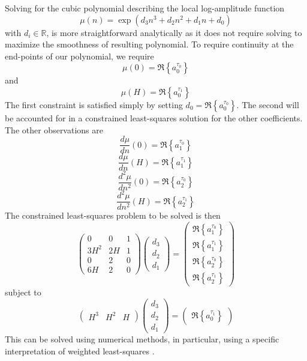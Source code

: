 Solving for the cubic polynomial describing the local log-amplitude function
\[
    \mu(n) = \exp \left(d_3 n^{3} + d_2 n^{2} + d_1 n + d_0 \right)
\]
with $d_i \in \mathbb{R}$, is more straightforward analytically as it does not
require solving to maximize the smoothness of resulting polynomial. To require
continuity at the end-points of our polynomial, we require
\[
    \mu(0) = \Re \left\{ a^{\tau_0}_0 \right\}
\]
and
\[
    \mu(H) = \Re \left\{ a^{\tau_1}_0 \right\}
\]
The first constraint is satisfied simply by setting $d_0 = \Re \left\{
a^{\tau_0}_0 \right\}$. The second will be accounted for in a constrained
least-squares solution for the other coefficients. The other observations are
\[
    \frac{d \mu}{dn} (0) = \Re \left\{ a^{\tau_0}_1 \right\}
\]
\[
    \frac{d \mu}{dn} (H) = \Re \left\{ a^{\tau_1}_1 \right\}
\]
\[
    \frac{d^2 \mu}{dn^2} (0) = \Re \left\{ a^{\tau_0}_2 \right\}
\]
\[
    \frac{d^2 \mu}{dn^2} (H) = \Re \left\{ a^{\tau_1}_2 \right\}
\]
The constrained least-squares problem to be solved is then
\[
    \begin{pmatrix}
        0 & 0 & 1 \\
        3 H^2 & 2 H & 1 \\
        0 & 2 & 0 \\
        6 H & 2 & 0
    \end{pmatrix}
    \begin{pmatrix}
        d_3 \\
        d_2 \\
        d_1
    \end{pmatrix}
    =
    \begin{pmatrix}
        \Re \left\{ a^{\tau_0}_1 \right\} \\
        \Re \left\{ a^{\tau_1}_1 \right\} \\
        \Re \left\{ a^{\tau_0}_2 \right\} \\
        \Re \left\{ a^{\tau_1}_2 \right\}
    \end{pmatrix}
\]
subject to
\[
    \begin{pmatrix}
        H^3 & H^2 & H
    \end{pmatrix}
    \begin{pmatrix}
        d_3 \\
        d_2 \\
        d_1
    \end{pmatrix}
    =
    \begin{pmatrix}
        \Re \left\{ a^{\tau_1}_0 \right\}
    \end{pmatrix}
\]
This can be solved using numerical methods, in particular, using a specific
interpretation of weighted least-squares \cite[p.~266]{golub1996matrix}.

